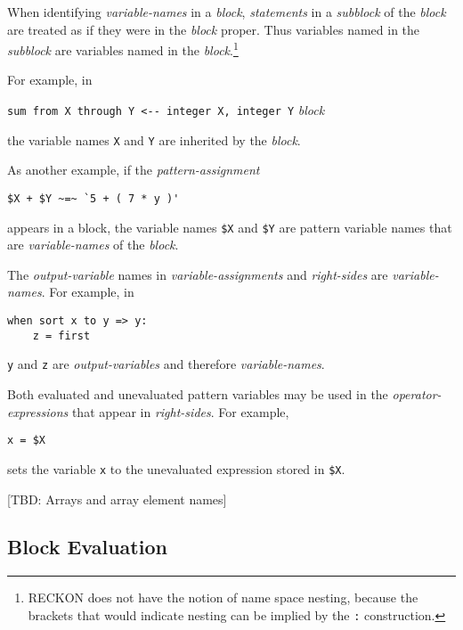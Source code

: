 \documentclass[12pt]{article}
\newcommand{\LEFTBRACKET}{\usebox{\LEFTBRACKETBOX}}
\newcommand{\RIGHTBRACKET}{\usebox{\RIGHTBRACKETBOX}}
\newenvironment{indpar}[1][0.3in]%
	{\begin{list}{}%
		     {\setlength{\itemsep}{0in}%
		      \setlength{\topsep}{0in}%
		      \setlength{\parsep}{1ex}%
		      \setlength{\labelwidth}{#1}%
		      \setlength{\leftmargin}{#1}%
		      \addtolength{\leftmargin}{\labelsep}}%
	 \item}%
	{\end{list}}
\begin{document}
When identifying {\em variable-names} in a {\em block}, {\em statements} in a
{\em subblock} of the {\em block} are treated as if they
were in the {\em block} proper.  Thus variables named in the
{\em subblock} are variables named in the {\em block}.\footnote{
RECKON does not have the notion of name space nesting, because the
{\tt \LEFTBRACKET\RIGHTBRACKET} brackets that would
indicate nesting can be implied by the {\tt :} construction.}

For example, in

\begin{indpar}[1in]
\verb|sum from X through Y <-- integer X, integer Y| {\em block}
\end{indpar}

the variable names \verb|X| and \verb|Y| are inherited by the {\em block}.

As another example, if the {\em pattern-assignment}

\begin{indpar}[1in]
\verb|$X + $Y ~=~ `5 + ( 7 * y )'|
\end{indpar}

appears in a block,
the variable names \verb|$X| and \verb|$Y| are pattern variable names
that are {\em variable-names} of the {\em block}.

The {\em output-variable} names in {\em variable-assignments}
and {\em right-sides} are {\em variable-names}.  For example, in

\begin{indpar}[1in]\begin{verbatim}
when sort x to y => y:
    z = first 
\end{verbatim}\end{indpar}

\verb|y| and \verb|z| are {\em output-variables} and therefore
{\em variable-names}.

Both evaluated and unevaluated pattern variables may be used in
the {\em operator-expressions} that appear in {\em right-sides}.
For example,
\begin{indpar}[1in]\begin{verbatim}
x = $X
\end{verbatim}\end{indpar}

sets the variable \verb|x| to the unevaluated expression stored in
\verb|$X|.

[TBD: Arrays and array element names]

\subsection{Block Evaluation}
\label{BLOCK-EVALUATION}
\end{document}
